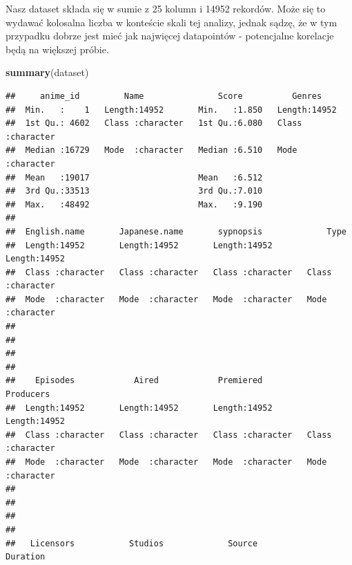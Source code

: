 \documentclass[
]{article}
\newenvironment{Shaded}{\begin{snugshade}}{\end{snugshade}}
\newcommand{\FunctionTok}[1]{\textcolor[rgb]{0.13,0.29,0.53}{\textbf{#1}}}
\newcommand{\NormalTok}[1]{#1}
\begin{document}
Nasz dataset składa się w sumie z 25 kolumn i 14952 rekordów. Może się
to wydawać kolosalna liczba w konteście skali tej analizy, jednak sądzę,
że w tym przypadku dobrze jest mieć jak najwięcej datapointów -
potencjalne korelacje będą na większej próbie.

\begin{Shaded}
\begin{Highlighting}[]
\FunctionTok{summary}\NormalTok{(dataset)}
\end{Highlighting}
\end{Shaded}

\begin{verbatim}
##     anime_id         Name               Score          Genres         
##  Min.   :    1   Length:14952       Min.   :1.850   Length:14952      
##  1st Qu.: 4602   Class :character   1st Qu.:6.080   Class :character  
##  Median :16729   Mode  :character   Median :6.510   Mode  :character  
##  Mean   :19017                      Mean   :6.512                     
##  3rd Qu.:33513                      3rd Qu.:7.010                     
##  Max.   :48492                      Max.   :9.190                     
##                                                                       
##  English.name       Japanese.name       sypnopsis             Type          
##  Length:14952       Length:14952       Length:14952       Length:14952      
##  Class :character   Class :character   Class :character   Class :character  
##  Mode  :character   Mode  :character   Mode  :character   Mode  :character  
##                                                                             
##                                                                             
##                                                                             
##                                                                             
##    Episodes            Aired            Premiered          Producers        
##  Length:14952       Length:14952       Length:14952       Length:14952      
##  Class :character   Class :character   Class :character   Class :character  
##  Mode  :character   Mode  :character   Mode  :character   Mode  :character  
##                                                                             
##                                                                             
##                                                                             
##                                                                             
##   Licensors           Studios             Source            Duration        

\end{verbatim}
\end{document}
